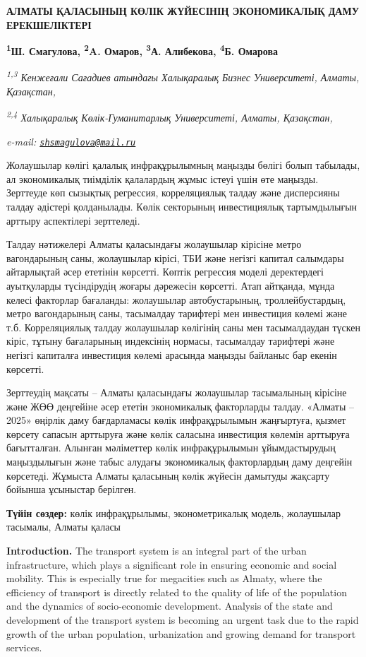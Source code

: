 {\bfseries АЛМАТЫ ҚАЛАСЫНЫҢ КӨЛІК ЖҮЙЕСІНІҢ ЭКОНОМИКАЛЫҚ ДАМУ
ЕРЕКШЕЛІКТЕРІ}

{\bfseries \textsuperscript{1}Ш. Смагулова\textsuperscript{\envelope },
\textsuperscript{2}A. Омаров, \textsuperscript{3}А. Алибекова,
\textsuperscript{4}Б. Омарова}

\emph{\textsuperscript{1,3} Кенжеғали Сағадиев атындағы Халықаралық
Бизнес Университеті, Алматы, Қазақстан,}

\emph{\textsuperscript{2,4} Халықаралық Көлік-Гуманитарлық Университеті,
Алматы, Қазақстан,}

\emph{e-mail:
\href{mailto:shsmagulova@mail.ru}{\nolinkurl{shsmagulova@mail.ru}}}

Жолаушылар көлігі қалалық инфрақұрылымның маңызды бөлігі болып табылады,
ал экономикалық тиімділік қалалардың жұмыс істеуі үшін өте маңызды.
Зерттеуде көп сызықтық регрессия, корреляциялық талдау және дисперсияны
талдау әдістері қолданылады. Көлік секторының инвестициялық
тартымдылығын арттыру аспектілері зерттеледі.

Талдау нәтижелері Алматы қаласындағы жолаушылар кірісіне метро
вагондарының саны, жолаушылар кірісі, ТБИ және негізгі капитал салымдары
айтарлықтай әсер ететінін көрсетті. Көптік регрессия моделі деректердегі
ауытқуларды түсіндірудің жоғары дәрежесін көрсетті. Атап айтқанда, мұнда
келесі факторлар бағаланды: жолаушылар автобустарының, троллейбустардың,
метро вагондарының саны, тасымалдау тарифтері мен инвестиция көлемі және
т.б. Корреляциялық талдау жолаушылар көлігінің саны мен тасымалдаудан
түскен кіріс, тұтыну бағаларының индексінің нормасы, тасымалдау
тарифтері және негізгі капиталға инвестиция көлемі арасында маңызды
байланыс бар екенін көрсетті.

Зерттеудің мақсаты -- Алматы қаласындағы жолаушылар тасымалының кірісіне
және ЖӨӨ деңгейіне әсер ететін экономикалық факторларды талдау. «Алматы
-- 2025» өңірлік даму бағдарламасы көлік инфрақұрылымын жаңғыртуға,
қызмет көрсету сапасын арттыруға және көлік саласына инвестиция көлемін
арттыруға бағытталған. Алынған мәліметтер көлік инфрақұрылымын
ұйымдастырудың маңыздылығын және табыс алудағы экономикалық факторлардың
даму деңгейін көрсетеді. Жұмыста Алматы қаласының көлік жүйесін дамытуды
жақсарту бойынша ұсыныстар берілген.

{\bfseries Түйін сөздер:} көлік инфрақұрылымы, эконометрикалық модель,
жолаушылар тасымалы, Алматы қаласы

{\bfseries Introduction.} The transport system is an integral part of the
urban infrastructure, which plays a significant role in ensuring
economic and social mobility. This is especially true for megacities
such as Almaty, where the efficiency of transport is directly related to
the quality of life of the population and the dynamics of socio-economic
development. Analysis of the state and development of the transport
system is becoming an urgent task due to the rapid growth of the urban
population, urbanization and growing demand for transport services.

